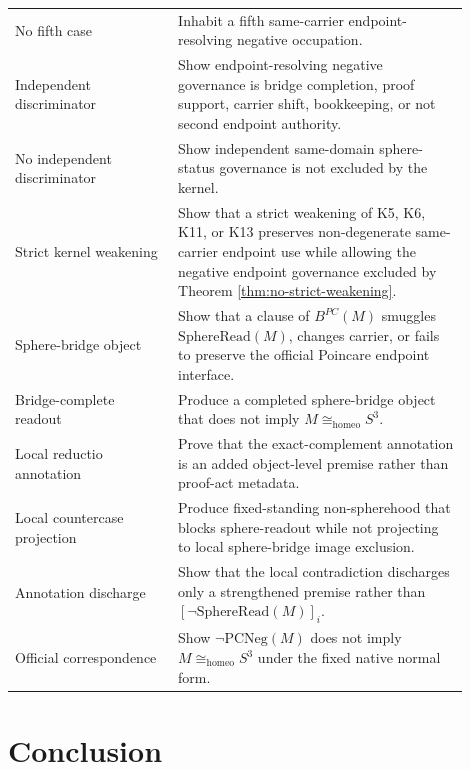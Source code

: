 \documentclass[11pt]{article}
\newcommand{\Sthree}{S^{3}}
\newcommand{\SphereRead}{\mathrm{SphereRead}}
\newcommand{\PCNeg}{\mathrm{PCNeg}}
\newcommand{\BridgeObjPC}{B^{PC}}
\newcommand{\Homeo}{\cong_{\mathrm{homeo}}}
\begin{document}
\begin{longtable}{L{0.32\linewidth}L{0.58\linewidth}}
No fifth case & Inhabit a fifth same-carrier endpoint-resolving negative occupation.\\
Independent discriminator & Show endpoint-resolving negative governance is bridge completion, proof support, carrier shift, bookkeeping, or not second endpoint authority.\\
No independent discriminator & Show independent same-domain sphere-status governance is not excluded by the kernel.\\
Strict kernel weakening & Show that a strict weakening of K5, K6, K11, or K13 preserves non-degenerate same-carrier endpoint use while allowing the negative endpoint governance excluded by Theorem \ref{thm:no-strict-weakening}.\\
Sphere-bridge object & Show that a clause of \(\BridgeObjPC(M)\) smuggles \(\SphereRead(M)\), changes carrier, or fails to preserve the official Poincare endpoint interface.\\
Bridge-complete readout & Produce a completed sphere-bridge object that does not imply \(M\Homeo\Sthree\).\\
Local reductio annotation & Prove that the exact-complement annotation is an added object-level premise rather than proof-act metadata.\\
Local countercase projection & Produce fixed-standing non-spherehood that blocks sphere-readout while not projecting to local sphere-bridge image exclusion.\\
Annotation discharge & Show that the local contradiction discharges only a strengthened premise rather than \([\neg\SphereRead(M)]_i\).\\
Official correspondence & Show \(\neg\PCNeg(M)\) does not imply \(M\Homeo\Sthree\) under the fixed native normal form.\\
\bottomrule
\end{longtable}

\section{Conclusion}\label{sec:conclusion}
\end{document}

